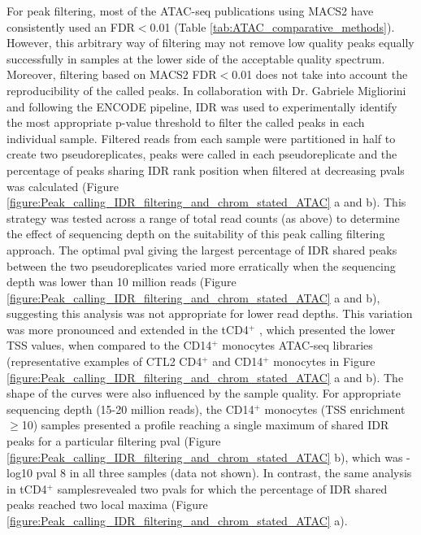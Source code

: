 For peak filtering, most of the ATAC-seq publications using MACS2 have consistently used an FDR$<$0.01 (Table \ref{tab:ATAC_comparative_methods}). However, this arbitrary way of filtering may not remove low quality peaks equally successfully in samples at the lower side of the acceptable quality spectrum. Moreover, filtering based on MACS2 FDR$<$0.01 does not take into account the reproducibility of the called peaks. In collaboration with Dr. Gabriele Migliorini and following the ENCODE pipeline, IDR was used to experimentally identify the most appropriate p-value threshold to filter the called peaks in each individual sample. Filtered reads from each sample were partitioned in half to create two pseudoreplicates, peaks were called in each pseudoreplicate and the percentage of peaks sharing IDR rank position when filtered at decreasing pvals was calculated (Figure \ref{figure:Peak_calling_IDR_filtering_and_chrom_stated_ATAC} a and b). This strategy was tested across a range of total read counts (as above) to determine the effect of sequencing depth on the suitability of this peak calling filtering approach. The optimal pval giving the largest percentage of IDR shared peaks between the two pseudoreplicates varied more erratically when the sequencing depth was lower than 10 million reads (Figure \ref{figure:Peak_calling_IDR_filtering_and_chrom_stated_ATAC} a and b), suggesting this analysis was not appropriate for lower read depths. This variation was more pronounced and extended in the tCD4$^+$ , which presented the lower TSS values, when compared to the CD14$^+$ monocytes ATAC-seq libraries (representative examples of CTL2 CD4$^+$ and CD14$^+$ monocytes in Figure \ref{figure:Peak_calling_IDR_filtering_and_chrom_stated_ATAC} a and b). The shape of the curves were also influenced by the sample quality. For appropriate sequencing depth (15-20 million reads), the CD14$^+$ monocytes (TSS enrichment $\geq$10) samples presented a profile reaching a single maximum of shared IDR peaks for a particular filtering pval (Figure \ref{figure:Peak_calling_IDR_filtering_and_chrom_stated_ATAC} b), which was -log10 pval 8 in all three samples (data not shown). In contrast, the same analysis in tCD4$^+$ samplesrevealed two pvals for which the percentage of IDR shared peaks reached two local maxima (Figure \ref{figure:Peak_calling_IDR_filtering_and_chrom_stated_ATAC} a). 



